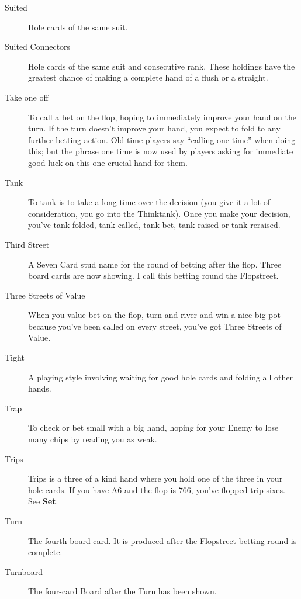 \begin{description}
\item[Suited] Hole cards of the same suit.

\item[Suited Connectors] Hole cards of the same suit and consecutive
rank. These holdings have the greatest chance of making a complete hand of
a flush or a straight.

\item[Take one off] To call a bet on the flop, hoping to immediately
improve your hand on the turn. If the turn doesn't improve your hand,
you expect to fold to any further betting action. Old-time players say
``calling one time'' when doing this; but the phrase one time is now
used by players asking for immediate good luck on this one crucial
hand for them.

\item[Tank] To tank is to take a long time over the decision
(you give it a lot of consideration, you go into the Thinktank).
Once you make your decision, you've tank-folded, tank-called, tank-bet,
tank-raised or tank-reraised.


\item[Third Street] A Seven Card stud name for the round of betting
after the flop. Three board cards are now showing. I call this betting
round the Flopstreet.

\item[Three Streets of Value] When you value bet on the flop, turn
and river and win a nice big pot because you've been called on every
street, you've got Three Streets of Value.

\item[Tight] A playing style involving waiting for good hole cards and
folding all other hands.

\item[Trap] To check or bet small with a big hand, hoping for your Enemy
to lose many chips by reading you as weak.

\item[Trips] Trips is a three of a kind hand where you hold one of the
three in your hole cards. If you have A6 and the flop is 766, you've
flopped trip sixes. See \textbf{Set}.

\item[Turn] The fourth board card. It is produced after the Flopstreet
betting round is complete.

\item[Turnboard] The four-card Board after the Turn has been shown.


\end{description}
